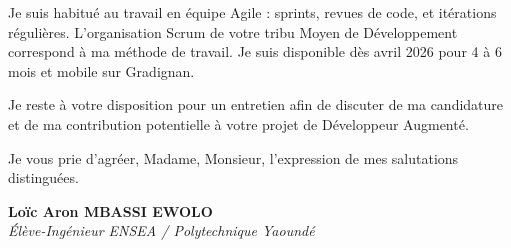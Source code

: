 \documentclass[a4paper,11pt]{article}
\begin{document}
Je suis habitué au travail en équipe Agile : sprints, revues de code, et itérations régulières. L'organisation Scrum de votre tribu Moyen de Développement correspond à ma méthode de travail. Je suis disponible dès avril 2026 pour 4 à 6 mois et mobile sur Gradignan.

Je reste à votre disposition pour un entretien afin de discuter de ma candidature et de ma contribution potentielle à votre projet de Développeur Augmenté.

Je vous prie d'agréer, Madame, Monsieur, l'expression de mes salutations distinguées.

\vspace{0.8cm}

\textbf{Loïc Aron MBASSI EWOLO}\\
\textit{Élève-Ingénieur ENSEA / Polytechnique Yaoundé}
\end{document}
